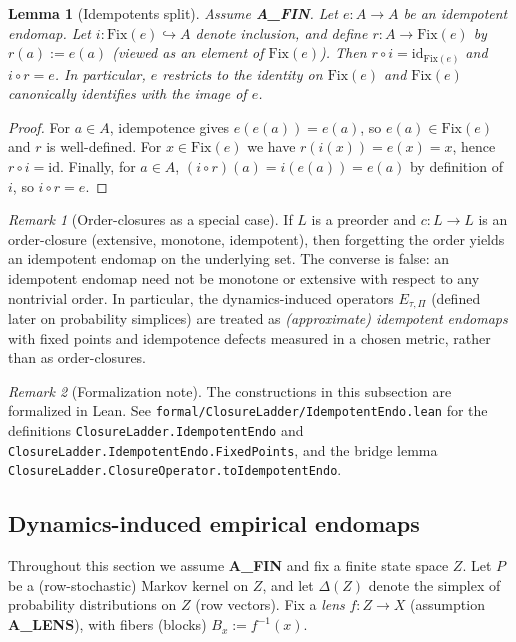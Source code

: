 \documentclass[11pt]{article}
\newtheorem{lemma}{Lemma}
\theoremstyle{remark}
\newtheorem{remark}{Remark}
\begin{document}
\begin{lemma}[Idempotents split]
Assume \textbf{A\_FIN}.
Let $e : A \to A$ be an idempotent endomap. Let $i:\mathrm{Fix}(e)\hookrightarrow A$
denote inclusion, and define $r:A\to \mathrm{Fix}(e)$ by $r(a):=e(a)$ (viewed as an
element of $\mathrm{Fix}(e)$).
Then $r\circ i = \mathrm{id}_{\mathrm{Fix}(e)}$ and $i\circ r = e$.
In particular, $e$ restricts to the identity on $\mathrm{Fix}(e)$ and
$\mathrm{Fix}(e)$ canonically identifies with the image of $e$.
\end{lemma}

\begin{proof}
For $a\in A$, idempotence gives $e(e(a))=e(a)$, so $e(a)\in \mathrm{Fix}(e)$ and
$r$ is well-defined. For $x\in \mathrm{Fix}(e)$ we have $r(i(x))=e(x)=x$, hence
$r\circ i=\mathrm{id}$. Finally, for $a\in A$, $(i\circ r)(a)=i(e(a))=e(a)$ by
definition of $i$, so $i\circ r=e$.
\end{proof}

\begin{remark}[Order-closures as a special case]
If $L$ is a preorder and $c:L\to L$ is an order-closure (extensive, monotone,
idempotent), then forgetting the order yields an idempotent endomap on the
underlying set. The converse is false: an idempotent endomap need not be monotone
or extensive with respect to any nontrivial order.  In particular, the
dynamics-induced operators $E_{\tau,\Pi}$ (defined later on probability simplices)
are treated as \emph{(approximate) idempotent endomaps} with fixed points and
idempotence defects measured in a chosen metric, rather than as order-closures.
\end{remark}

\begin{remark}[Formalization note]
The constructions in this subsection are formalized in Lean.
See \texttt{formal/ClosureLadder/IdempotentEndo.lean} for the definitions
\texttt{ClosureLadder.IdempotentEndo} and \texttt{ClosureLadder.IdempotentEndo.FixedPoints},
and the bridge lemma \texttt{ClosureLadder.ClosureOperator.toIdempotentEndo}.
\end{remark}

\subsection{Dynamics-induced empirical endomaps}
\label{sec:empirical-closure}

Throughout this section we assume \textbf{A\_FIN} and fix a finite state space $Z$.
Let $P$ be a (row-stochastic) Markov kernel on $Z$, and let $\Delta(Z)$ denote the simplex
of probability distributions on $Z$ (row vectors).
Fix a \emph{lens} $f:Z\to X$ (assumption \textbf{A\_LENS}), with fibers (blocks)
$B_x:=f^{-1}(x)$.
\end{document}
